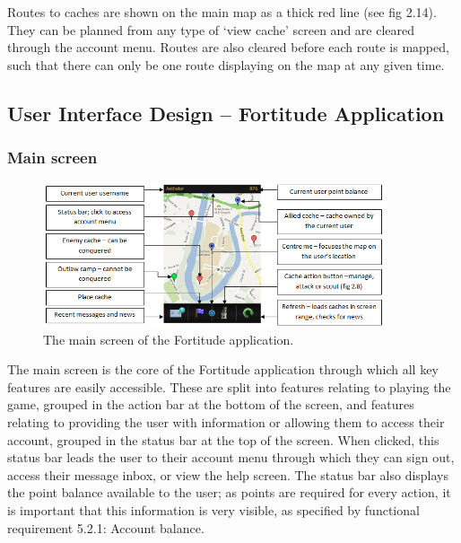 Routes to caches are shown on the main map as a thick red line (see fig 2.14). They can be planned from any type of ‘view cache’ screen and are cleared through the account menu. Routes are also cleared before each route is mapped, such that there can only be one route displaying on the map at any given time.
\vspace{30pt}

\subsection{User Interface Design – Fortitude Application}

\subsubsection{Main screen}

\begin{figure}[ht]
	\begin{center}
	\includegraphics[width=0.9\textwidth]{images/main_screen}
	\caption{The main screen of the Fortitude application.}
	\label{main_screen}
	\end{center}
\end{figure}

The main screen is the core of the Fortitude application through which all key features are easily accessible. These are split into features relating to playing the game, grouped in the action bar at the bottom of the screen, and features relating to providing the user with information or allowing them to access their account, grouped in the status bar at the top of the screen. When clicked, this status bar leads the user to their account menu through which they can sign out, access their message inbox, or view the help screen. The status bar also displays the point balance available to the user; as points are required for every action, it is important that this information is very visible, as specified by functional requirement 5.2.1: Account balance.

